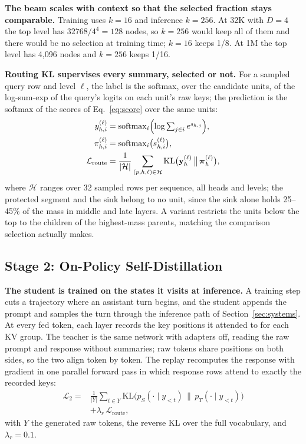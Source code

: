 \documentclass[10pt,twocolumn]{article}
\newcommand{\para}[1]{\noindent\textbf{#1}\hspace{0.5em}}
\begin{document}
\para{The beam scales with context so that the selected fraction stays comparable.}
Training uses $k=16$ and inference $k=256$. At 32K with $D=4$ the top level has
$32768/4^4=128$ nodes, so $k=256$ would keep all of them and there would be no selection at
training time; $k=16$ keeps 1/8. At 1M the top level has 4,096 nodes and $k=256$ keeps 1/16.

\para{Routing KL supervises every summary, selected or not.}
For a sampled query row and level $\ell$, the label is the softmax, over the candidate units,
of the log-sum-exp of the query's logits on each unit's raw keys; the prediction is the
softmax of the scores of Eq.~\eqref{eq:score} over the same units:
\begin{equation}
\begin{aligned}
  y^{(\ell)}_{h,i} &= \operatorname{softmax}_i\Bigl(\log\textstyle\sum_{j\in i}e^{s_{h,j}}\Bigr),\\
  \pi^{(\ell)}_{h,i} &= \operatorname{softmax}_i\bigl(s^{(\ell)}_{h,i}\bigr),\\
  \mathcal{L}_{\text{route}} &= \frac{1}{|\mathcal{H}|}\sum_{(p,h,\ell)\in\mathcal{H}}
   \mathrm{KL}\bigl(\mathbf{y}^{(\ell)}_{h}\,\big\|\,\boldsymbol{\pi}^{(\ell)}_{h}\bigr),
\end{aligned}
  \label{eq:route}
\end{equation}
where $\mathcal{H}$ ranges over 32 sampled rows per sequence, all heads and levels; the protected segment and the sink
belong to no unit, since the sink alone holds 25--45\% of the mass in middle and late layers.
A variant restricts the units below the top to the children of the highest-mass parents,
matching the comparison selection actually makes.

\subsection{Stage 2: On-Policy Self-Distillation}
\label{sec:opsd}

\para{The student is trained on the states it visits at inference.}
A training step cuts a trajectory where an assistant turn begins, and the student appends the
prompt and samples the turn through the inference path of Section~\ref{sec:systems}. At every
fed token, each layer records the key positions it attended to for each KV group. The teacher
is the same network with adapters off, reading the raw prompt and response without summaries;
raw tokens share positions on both sides, so the two align token by token. The replay
recomputes the response with gradient in one parallel forward pass in which response rows
attend to exactly the recorded keys:
\begin{equation}
\begin{aligned}
  \mathcal{L}_2 = {}&\frac{1}{|Y|}\sum_{t\in Y}
   \mathrm{KL}\bigl(p_S(\cdot\mid y_{<t})\,\big\|\,p_T(\cdot\mid y_{<t})\bigr)\\
   &+ \lambda_r\,\mathcal{L}_{\text{route}},
\end{aligned}
  \label{eq:opsd}
\end{equation}
with $Y$ the generated raw tokens, the reverse KL over the full vocabulary, and $\lambda_r=0.1$.
\end{document}
